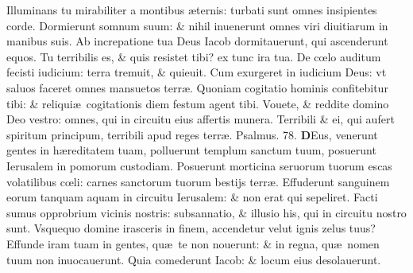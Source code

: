 \documentclass[a5paper,10pt]{book}
\def\ae{æ}
\def\oe{œ}
\begin{document}
\begin{multicols*}{2}
\newline \color{red} I\color{black}lluminans tu mirabiliter a montibus \ae ternis: turbati sunt omnes insipientes corde.
\newline \color{red} D\color{black}ormierunt somnum suum: \& nihil inuenerunt omnes viri diuitiarum in manibus suis.
\newline \color{red} A\color{black}b increpatione tua Deus Iacob dormitauerunt, qui ascenderunt equos.
\newline \color{red} T\color{black}u terribilis es, \& quis resistet tibi? ex tunc ira tua.
\newline \color{red} D\color{black}e c\oe lo auditum fecisti iudicium: terra tremuit, \& quieuit.
\newline \color{red} C\color{black}um exurgeret in iudicium Deus: vt saluos faceret omnes mansuetos terr\ae .
\newline \color{red} Q\color{black}uoniam cogitatio hominis confitebitur tibi: \& reliqui\ae \ cogitationis diem festum agent tibi.
\newline \color{red} V\color{black}ouete, \& reddite domino Deo vestro: omnes, qui in circuitu eius affertis munera.
\newline \color{red} T\color{black}erribili \& ei, qui aufert spiritum principum, terribili apud reges terr\ae .
\newline \color{red} Psalmus. 78. \color{black}
\vspace{-.25em}
\lettrine[lines=2]{\bfseries \color{red} D}{}Eus, venerunt gentes in h\ae reditatem tuam, polluerunt templum sanctum tuum, posuerunt Ierusalem in pomorum custodiam.
\newline \color{red} P\color{black}osuerunt morticina seruorum tuorum escas volatilibus c\oe li: carnes sanctorum tuorum bestijs terr\ae .
\newline \color{red} E\color{black}ffuderunt sanguinem eorum tanquam aquam in circuitu Ierusalem: \& non erat qui sepeliret.
\newline \color{red} F\color{black}acti sumus opprobrium vicinis nostris: subsannatio, \& illusio his, qui in circuitu nostro sunt.
\newline \color{red} V\color{black}squequo domine irasceris in finem, accendetur velut ignis zelus tuus?
\newline \color{red} E\color{black}ffunde iram tuam in gentes, qu\ae \ te non nouerunt: \& in regna, qu\ae \ nomen tuum non inuocauerunt.
\newline \color{red} Q\color{black}uia comederunt Iacob: \& locum eius desolauerunt.

\end{multicols*}
\end{document}
